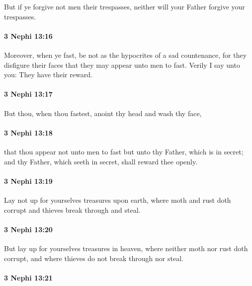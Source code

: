 			But if ye forgive not men their trespasses,
			neither will your Father forgive your trespasses.

		\paragraph{3 Nephi 13:16} %
			\label{3NEPHI-13-16}

			Moreover, when ye fast,
			be not as the hypocrites of a sad countenance,
			for they disfigure their faces that they may appear unto men to fast.
			Verily I say unto you:
			They have their reward.

		\paragraph{3 Nephi 13:17} %
			\label{3NEPHI-13-17}

			But thou, when thou fastest,
			anoint thy head and wash thy face,

		\paragraph{3 Nephi 13:18} %
			\label{3NEPHI-13-18}

			that thou appear not unto men to fast
			but unto thy Father, which is in secret;
			and thy Father, which seeth in secret, shall reward thee openly.

		\paragraph{3 Nephi 13:19} %
			\label{3NEPHI-13-19}

			Lay not up for yourselves treasures upon earth,
			where moth and rust doth corrupt
			and thieves break through and steal.

		\paragraph{3 Nephi 13:20} %
			\label{3NEPHI-13-20}

			But lay up for yourselves treasures in heaven,
			where neither moth nor rust doth corrupt,
			and where thieves do not break through nor steal.

		\paragraph{3 Nephi 13:21} %
			\label{3NEPHI-13-21}

